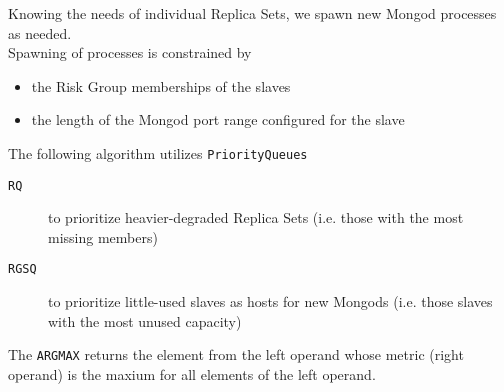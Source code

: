 Knowing the needs of individual Replica Sets, we spawn new Mongod processes as needed.\\
Spawning of processes is constrained by
\begin{itemize}
  \item the Risk Group memberships of the slaves
  \item the length of the Mongod port range configured for the slave
\end{itemize}

The following algorithm utilizes \texttt{PriorityQueues}
\begin{description}
  \item[\texttt{RQ}] to prioritize heavier-degraded Replica Sets (i.e. those with the most missing members)
  \item[\texttt{RGSQ}] to prioritize little-used slaves as hosts for new Mongods (i.e. those slaves with the most unused capacity)
\end{description} 

The \texttt{ARGMAX} returns the element from the left operand whose metric (right operand) is the maxium for all elements of the left operand.

